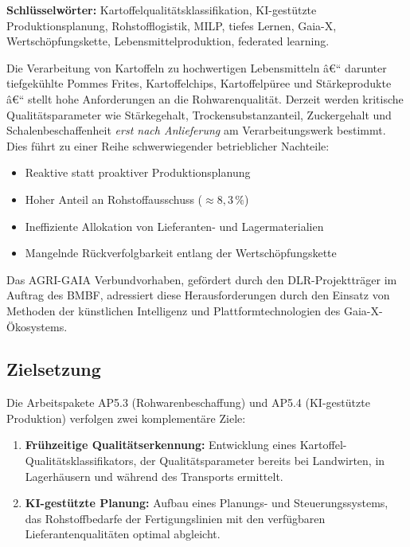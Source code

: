 ﻿\documentclass[12pt,a4paper]{article}
\theoremstyle{plain}
\theoremstyle{definition}
\begin{document}
	\textbf{Schlüsselwörter:} Kartoffelqualitätsklassifikation, KI-gestützte
	Produktionsplanung, Rohstofflogistik, MILP, tiefes Lernen, Gaia-X,
	Wertschöpfungskette, Lebensmittelproduktion, federated learning.
	
	Die Verarbeitung von Kartoffeln zu hochwertigen Lebensmitteln â€“ darunter
	tiefgekühlte Pommes Frites, Kartoffelchips, Kartoffelpüree und Stärkeprodukte
	â€“ stellt hohe Anforderungen an die Rohwarenqualität. Derzeit werden kritische
	Qualitätsparameter wie Stärkegehalt, Trockensubstanzanteil, Zuckergehalt und
	Schalenbeschaffenheit \emph{erst nach Anlieferung} am Verarbeitungswerk
	bestimmt. Dies führt zu einer Reihe schwerwiegender betrieblicher Nachteile:
	
	\begin{itemize}[leftmargin=1.5em]
		\item Reaktive statt proaktiver Produktionsplanung
		\item Hoher Anteil an Rohstoffausschuss ($\approx 8{,}3\,\%$)
		\item Ineffiziente Allokation von Lieferanten- und Lagermaterialien
		\item Mangelnde Rückverfolgbarkeit entlang der Wertschöpfungskette
	\end{itemize}
	
	Das AGRI-GAIA Verbundvorhaben, gefördert durch den DLR-Projektträger im
	Auftrag des BMBF, adressiert diese Herausforderungen durch den Einsatz
	von Methoden der künstlichen Intelligenz und Plattformtechnologien des
	Gaia-X-Ökosystems.
	
	\subsection{Zielsetzung}
	
	Die Arbeitspakete AP5.3 (Rohwarenbeschaffung) und AP5.4
	(KI-gestützte Produktion) verfolgen zwei komplementäre Ziele:
	
	\begin{enumerate}[label=\textbf{Z\arabic*.}]
		\item \textbf{Frühzeitige Qualitätserkennung:} Entwicklung eines
		Kartoffel-Qualitätsklassifika\-tors, der Qualitätsparameter bereits
		bei Landwirten, in Lagerhäusern und während des Transports ermittelt.
		\item \textbf{KI-gestützte Planung:} Aufbau eines Planungs- und
		Steuerungssystems, das Rohstoffbedarfe der Fertigungslinien mit den
		verfügbaren Lieferantenqualitäten optimal abgleicht.
	\end{enumerate}
	
\end{document}
